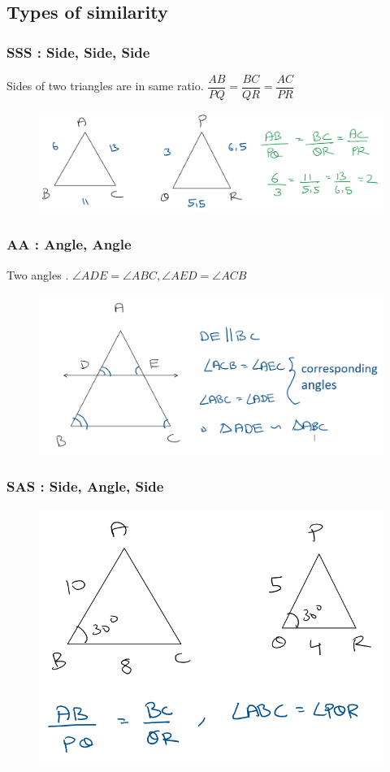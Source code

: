 \subsection{Types of similarity}

\subsubsection{SSS : Side, Side, Side}
Sides of two triangles are in same ratio. $\dfrac{AB}{PQ} = \dfrac{BC}{QR} = \dfrac{AC}{PR}$


\begin{figure}[h!]
    \centering
    \includegraphics[width=0.8\linewidth]{Quant//Geometry//Images//Triangles/rodha_triangle_6_sss.png}
\end{figure}

\subsubsection{AA : Angle, Angle}
Two angles . $\angle ADE = \angle ABC, \angle AED = \angle ACB$

\begin{figure}[h!]
    \centering
    \includegraphics[width=0.9\linewidth]{Quant//Geometry//Images//Triangles/rodha_triangle_6_aa.png}
\end{figure}

\subsubsection{SAS : Side, Angle, Side}

\begin{figure}[h!]
    \centering
    \includegraphics[width=0.5\linewidth]{Quant//Geometry//Images//Triangles/rodha_triangle_6_sas.png}
\end{figure}

